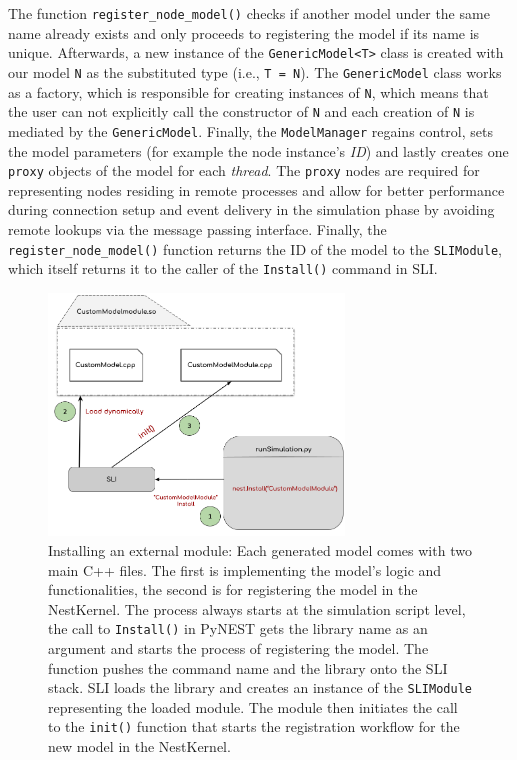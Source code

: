 The function \texttt{register\_node\_model()} checks if another model under the same name already exists and only proceeds to registering the model if its name is unique. Afterwards, a new instance of the \texttt{GenericModel<T>} class is created with our model \texttt{N} as the substituted type (i.e., \texttt{T = N}). The \texttt{GenericModel} class works as a factory, which is responsible for creating instances of \texttt{N}, which means that the user can not explicitly call the constructor of \texttt{N} and each creation of \texttt{N} is mediated by the \texttt{GenericModel}. Finally, the \texttt{ModelManager} regains control, sets the model parameters (for example the node instance's \emph{ID}) and lastly creates one \texttt{proxy} objects of the model for each \emph{thread}. The \texttt{proxy} nodes are required for representing nodes residing in remote processes and allow for better performance during connection setup and event delivery in the simulation phase by avoiding remote lookups via the message passing interface. Finally, the \texttt{register\_node\_model()} function returns the ID of the model to the \texttt{SLIModule}, which itself returns it to the caller of the \texttt{Install()} command in SLI.

\begin{figure}[ht!]
\centering
\includegraphics[width=0.7\textwidth]{src/pic/install_command.png}
\caption{Installing an external module: Each generated model comes with two main C++ files. The first is implementing the model's logic and functionalities, the second is for registering the model in the NestKernel. The process always starts at the simulation script level, the call to \texttt{Install()} in PyNEST gets the library name as an argument and starts the process of registering the model. The function pushes the command name and the library onto the SLI stack. SLI loads the library and creates an instance of the \texttt{SLIModule} representing the loaded module. The module then initiates the call to the \texttt{init()} function that starts the registration workflow for the new model in the NestKernel.}
\label{fig:sli_install}
\end{figure}

